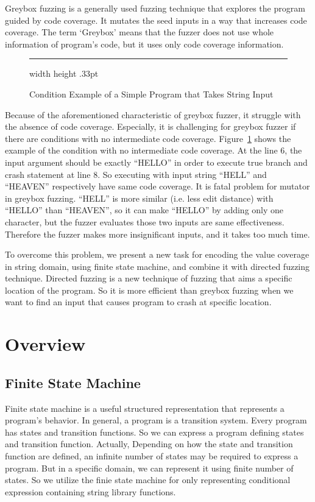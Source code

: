 \documentclass[12pt]{sigplanconf}
\begin{document}
Greybox fuzzing is a generally used fuzzing technique that explores the program guided by code coverage. It mutates the
seed inputs in a way that increases code coverage. The term `Greybox' means that the fuzzer does not use whole information
of program's code, but it uses only code coverage information.

\begin{figure}[h]
    \cFormat
    
    \hrule width \hsize height .33pt
    \caption{Condition Example of a Simple Program that Takes String Input}
    \label{fig:string-example}
  \end{figure}

Because of the aforementioned characteristic of greybox fuzzer, it struggle with the absence of code coverage. Especially,
it is challenging for greybox fuzzer if there are conditions with no intermediate code coverage. Figure~\ref{fig:string-example}
shows the example of the condition with no intermediate code coverage. At the line 6, the input argument should be exactly
``HELLO'' in order to execute true branch and crash statement at line 8. So executing with input string ``HELL'' and
``HEAVEN'' respectively have same code coverage. It is fatal problem for mutator in greybox fuzzing. ``HELL'' is more
similar (i.e. less edit distance) with ``HELLO'' than ``HEAVEN'', so it can make ``HELLO'' by adding only one character,
but the fuzzer evaluates those two inputs are same effectiveness. Therefore the fuzzer makes more insignificant inputs,
and it takes too much time.

To overcome this problem, we present a new task for encoding the value coverage in string domain, using finite state machine,
and combine it with directed fuzzing technique. Directed fuzzing is a new technique of fuzzing that aims a specific location
of the program. So it is more efficient than greybox fuzzing when we want to find an input that causes program to crash
at specific location.

\section{Overview}
\subsection{Finite State Machine}
Finite state machine is a useful structured representation that represents a program's behavior. In general, a program is
a transition system. Every program has states and transition functions. So we can express a program defining states and
transition function. Actually, Depending on how the state and transition function are defined, an infinite number of states
may be required to express a program. But in a specific domain, we can represent it using finite number of states. So we
utilize the finie state machine for only representing conditional expression containing string library functions.
\end{document}
